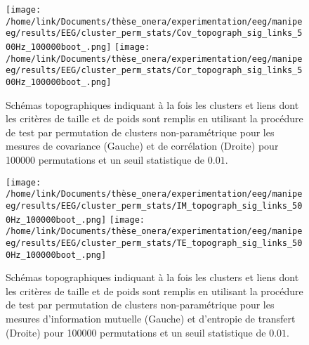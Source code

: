 \begin{landscape}
\begin{figure}[!t]
\texttt{[image: /home/link/Documents/thèse\_onera/experimentation/eeg/manipeeg/results/EEG/cluster\_perm\_stats/Cov\_topograph\_sig\_links\_500Hz\_100000boot\_.png]}
\texttt{[image: /home/link/Documents/thèse\_onera/experimentation/eeg/manipeeg/results/EEG/cluster\_perm\_stats/Cor\_topograph\_sig\_links\_500Hz\_100000boot\_.png]}
\caption[Topographie des clusters et des liens significatifs pour Cov et Cor]{Schémas topographiques indiquant à la fois les clusters et liens dont les critères de taille et de poids sont remplis en utilisant la procédure de test par permutation de clusters non-paramétrique pour les mesures de covariance (Gauche) et de corrélation (Droite) pour 100000 permutations et un seuil statistique de $0.01$.}
\label{fig:chap5clusterpermtestresultatscovcor}
\end{figure}
\end{landscape}

\begin{landscape}
\begin{figure}[!t]
\texttt{[image: /home/link/Documents/thèse\_onera/experimentation/eeg/manipeeg/results/EEG/cluster\_perm\_stats/IM\_topograph\_sig\_links\_500Hz\_100000boot\_.png]}
\texttt{[image: /home/link/Documents/thèse\_onera/experimentation/eeg/manipeeg/results/EEG/cluster\_perm\_stats/TE\_topograph\_sig\_links\_500Hz\_100000boot\_.png]}
\caption[Topographie des clusters et des liens significatifs pour IM et TE]{Schémas topographiques indiquant à la fois les clusters et liens dont les critères de taille et de poids sont remplis en utilisant la procédure de test par permutation de clusters non-paramétrique pour les mesures d'information mutuelle (Gauche) et d'entropie de transfert (Droite) pour 100000 permutations et un seuil statistique de $0.01$.}
\label{fig:chap5clusterpermtestresultatsimte}
\end{figure}
\end{landscape}

